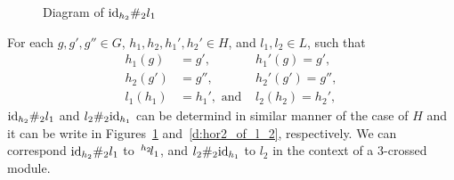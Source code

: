 \documentclass{tac}
\newcommand{\act}[1]{\,\sp{#1}\!}
\begin{document}
\begin{appendices}
\begin{figure}[!]
\begin{center}
\end{center}
\caption{Diagram of ${\rm id}_{h_2}\#_2 l_1$}
\label{d:hor2_of_l_1}
\end{figure}



For each $g, g', g'' \in G$, $h_1,h_2,h_1',h_2'\in H$, and $l_1, l_2\in L$, such that
\begin{equation*}
    \begin{aligned}
h_1(g) &= g',\ &h_1'(g) = g',\\
h_2(g') &= g'',\ &h_2'(g') = g'',\\
l_1(h_1)&= h_1', \text{ and } &l_2(h_2) = h_2' , 
    \end{aligned}
\end{equation*}
%
 ${\rm id}_{h_2}\#_2 l_1$ and $l_2 \#_2{\rm id}_{h_1}$ can be determind in similar manner of the case of $H$ and it can be write 
 in Figures~\ref{d:hor2_of_l_1} and~\ref{d:hor2_of_l_2}, respectively.
We can correspond ${\rm id}_{h_2}\#_2 l_1$ to $\act{h_2}l_1$, and $l_2 \#_2{\rm id}_{h_1}$ to $l_2$ in the context of a 3-crossed module.


\end{appendices}
\end{document}
